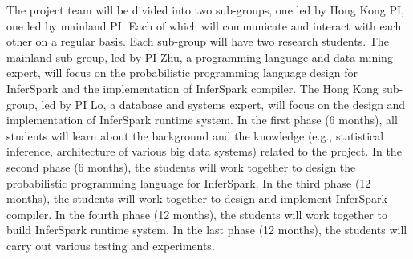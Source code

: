 \documentclass[a4paper,12pt,oneside,onecolumn,final]{book}
\let\oldbibliography
\renewcommand{}[1]{{
	\let\chapter\section
	\oldbibliography{#1}
}}
\begin{document}
The project team will be divided into two sub-groups, one led by Hong Kong PI, 
one led by mainland PI.
Each of which will communicate and interact with each other on a regular basis. 
Each sub-group will have two research students.
The mainland sub-group, led by PI Zhu, a programming language and 
data mining expert, will focus on the probabilistic programming 
language design for InferSpark
and the implementation of InferSpark compiler.
The Hong Kong sub-group, led by PI Lo, a database and systems expert, 
will focus on the design and implementation of InferSpark runtime system.
In the first phase (6 months), all students will learn about the background and the knowledge (e.g., statistical inference, architecture of various big data systems) related to the project.
In the second phase (6 months), the students will work together to 
design the probabilistic programming language for InferSpark.
In the third phase (12 months), the students will work together to 
design and implement InferSpark compiler.
In the fourth phase (12 months), the students will work together to build InferSpark runtime system.
In the last phase (12 months), the students will carry out various testing and experiments.





%
%
%


\setlength{\bibsep}{0.0pt}

{%
\small
% 
%
%

 
}

\end{document}
